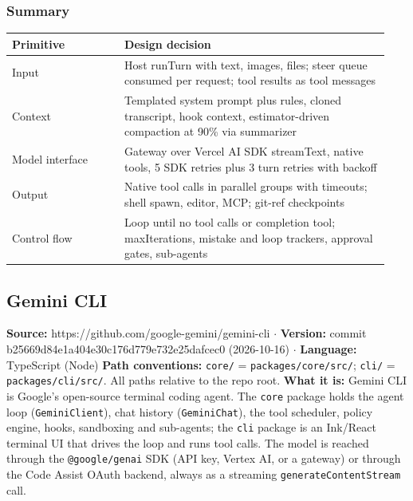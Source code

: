 \subsubsection*{Summary}
\begin{longtable}{@{}p{0.28\linewidth}p{0.66\linewidth}@{}}
\toprule \textbf{Primitive} & \textbf{Design decision} \\ \midrule \endhead
Input & Host runTurn with text, images, files; steer queue consumed per request; tool results as tool messages \\
Context & Templated system prompt plus rules, cloned transcript, hook context, estimator-driven compaction at 90\% via summarizer \\
Model interface & Gateway over Vercel AI SDK streamText, native tools, 5 SDK retries plus 3 turn retries with backoff \\
Output & Native tool calls in parallel groups with timeouts; shell spawn, editor, MCP; git-ref checkpoints \\
Control flow & Loop until no tool calls or completion tool; maxIterations, mistake and loop trackers, approval gates, sub-agents \\
\bottomrule \end{longtable}


\subsection{Gemini CLI}

\textbf{Source:} https://github.com/google-gemini/gemini-cli $\cdot$ \textbf{Version:} commit b25669d84e1a404e30c176d779e732e25dafcec0 (2026-10-16) $\cdot$ \textbf{Language:} TypeScript (Node)
\textbf{Path conventions:} \texttt{core/\allowbreak{}} = \texttt{packages/\allowbreak{}core/\allowbreak{}src/\allowbreak{}}; \texttt{cli/\allowbreak{}} = \texttt{packages/\allowbreak{}cli/\allowbreak{}src/\allowbreak{}}. All paths relative to the repo root.
\textbf{What it is:} Gemini CLI is Google's open-source terminal coding agent. The \texttt{core} package holds the agent loop (\texttt{GeminiClient}), chat history (\texttt{GeminiChat}), the tool scheduler, policy engine, hooks, sandboxing and sub-agents; the \texttt{cli} package is an Ink/React terminal UI that drives the loop and runs tool calls. The model is reached through the \texttt{@google/\allowbreak{}genai} SDK (API key, Vertex AI, or a gateway) or through the Code Assist OAuth backend, always as a streaming \texttt{generateContentStream} call.

